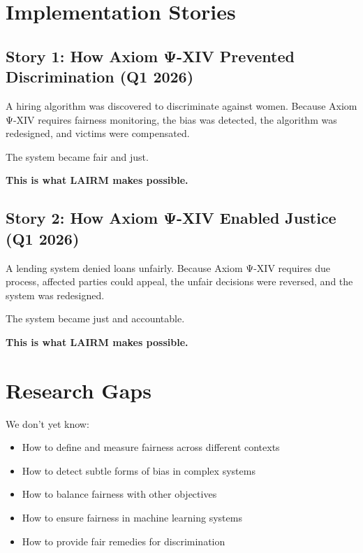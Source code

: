 \vspace{0.5cm}

\section{Implementation Stories}

\subsection{Story 1: How Axiom Ψ-XIV Prevented Discrimination (Q1 2026)}

A hiring algorithm was discovered to discriminate against women. Because Axiom Ψ-XIV requires fairness monitoring, the bias was detected, the algorithm was redesigned, and victims were compensated.

The system became fair and just.

\textbf{This is what LAIRM makes possible.}

\subsection{Story 2: How Axiom Ψ-XIV Enabled Justice (Q1 2026)}

A lending system denied loans unfairly. Because Axiom Ψ-XIV requires due process, affected parties could appeal, the unfair decisions were reversed, and the system was redesigned.

The system became just and accountable.

\textbf{This is what LAIRM makes possible.}

\vspace{0.5cm}

\section{Research Gaps}

We don't yet know:

\begin{itemize}
    \item How to define and measure fairness across different contexts
    
    \item How to detect subtle forms of bias in complex systems
    
    \item How to balance fairness with other objectives
    
    \item How to ensure fairness in machine learning systems
    
    \item How to provide fair remedies for discrimination
\end{itemize}

